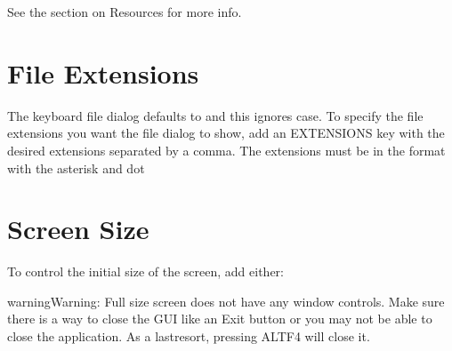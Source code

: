 \documentclass[letterpaper,10pt,english]{sphinxmanual}
\begin{document}
\begin{sphinxVerbatim}[commandchars=\\\{\}]
  
\end{sphinxVerbatim}

\sphinxAtStartPar
See the section on Resources for more info.


\section{File Extensions}
\label{\detokenize{ini:file-extensions}}
\sphinxAtStartPar
The keyboard file dialog defaults to  and this ignores case. To
specify the file extensions you want the file dialog to show, add an
EXTENSIONS key with the desired extensions separated by a comma. The
extensions must be in the format  with the asterisk and dot

\begin{sphinxVerbatim}[commandchars=\\\{\}]
     
\end{sphinxVerbatim}


\section{Screen Size}
\label{\detokenize{ini:screen-size}}
\sphinxAtStartPar
To control the initial size of the screen, add either:

\begin{sphinxVerbatim}[commandchars=\\\{\}]
  
  
  
  
\end{sphinxVerbatim}

\begin{sphinxadmonition}{warning}{Warning:}
\sphinxAtStartPar
Full size screen does not have any window controls. Make sure
there is a way to close the GUI like an Exit button or you may not be able to
close the application. As a last\sphinxhyphen{}resort, pressing ALT\sphinxhyphen{}F4 will close it.
\end{sphinxadmonition}
\end{document}
